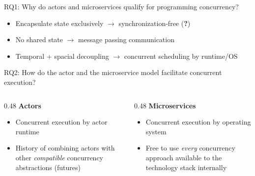 \documentclass{beamer}
\begin{document}

\begin{frame}{RQ1: Why do actors and microservices qualify for programming concurrency?}

\pause

\begin{itemize}
  \item Encapsulate state exclusively $\rightarrow$ synchronization-free (\textbf{?})
  \item No shared state $\rightarrow$ message passing communication
  \item Temporal $+$ spacial decoupling $\rightarrow$ concurrent scheduling by runtime/OS
\end{itemize}

\end{frame}


\begin{frame}{RQ2: How do the actor and the microservice model facilitate concurrent execution?}

\pause

\begin{columns}
  \begin{column} {0.48\textwidth} 
    \textbf{Actors}
    \begin{itemize}
      \item Concurrent execution by actor runtime
      \item History of combining actors with other \textit{compatible} concurrency abstractions (futures)
    \end{itemize}
  \end{column}
  \begin{column} {0.48\textwidth}
    \textbf{Microservices} \\
    \begin{itemize}
      \item Concurrent execution by operating system
      \item Free to use \textit{every} concurrency approach available to the technology stack internally
    \end{itemize}
  \end{column}
\end{columns}

\end{frame}

\end{document}
